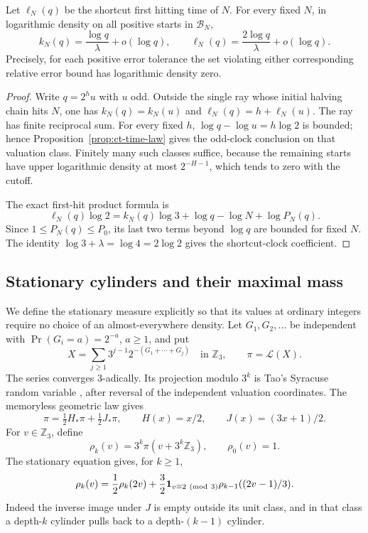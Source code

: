 \begin{proposition}
\label{prop:ct-clock-conversion}
Let \(\ell_N(q)\) be the shortcut first hitting time of \(N\).
For every fixed \(N\), in logarithmic density on all positive starts
in \(\mathcal B_N\),
\[
 k_N(q)=\frac{\log q}{\lambda}+o(\log q),\qquad
 \ell_N(q)=\frac{2\log q}{\lambda}+o(\log q).
\]
Precisely, for each positive error tolerance the set violating either
corresponding relative error bound has logarithmic density zero.
\end{proposition}
\begin{proof}
Write \(q=2^hu\) with \(u\) odd. Outside the single ray whose
initial halving chain hits \(N\), one has
\(k_N(q)=k_N(u)\) and \(\ell_N(q)=h+\ell_N(u)\).
The ray has finite reciprocal sum. For every fixed \(h\),
\(\log q-\log u=h\log2\) is bounded; hence
Proposition~\ref{prop:ct-time-law} gives the odd-clock conclusion
on that valuation class. Finitely many such classes suffice,
because the remaining starts have upper logarithmic density at most
\(2^{-H-1}\), which tends to zero with the cutoff.

The exact first-hit product formula is
\[
 \ell_N(q)\log2
 =k_N(q)\log3+\log q-\log N+\log P_N(q).
\]
Since \(1\le P_N(q)\le P_0\), its last two terms beyond
\(\log q\) are bounded for fixed \(N\).
The identity \(\log3+\lambda=\log4=2\log2\) gives the
shortcut-clock coefficient.
\end{proof}

\subsection{Stationary cylinders and their maximal mass}

We define the stationary measure explicitly so that its values at
ordinary integers require no choice of an almost-everywhere density.
Let \(G_1,G_2,\ldots\) be independent with
\(\Pr(G_i=a)=2^{-a}\), \(a\ge1\), and put
\begin{equation}\label{eq:ct-pi-series}
 X=\sum_{j\ge1}3^{j-1}2^{-(G_1+\cdots+G_j)}
       \quad\text{in }\mathbb Z_3,\qquad \pi=\mathcal L(X).
\end{equation}
The series converges \(3\)-adically. Its projection modulo \(3^k\)
is Tao's Syracuse random variable
\cite[Section~1.4, equations~(1.22)--(1.24)]{Tao2022},
after reversal of the independent valuation coordinates.
The memoryless geometric law gives
\[
 \pi=\tfrac12 H_*\pi+\tfrac12 J_*\pi,\qquad
 H(x)=x/2,\qquad J(x)=(3x+1)/2.
\]
For \(v\in\mathbb Z_3\), define
\begin{equation}\label{eq:ct-rho}
 \rho_k(v)=3^k\pi(v+3^k\mathbb Z_3),\qquad \rho_0(v)=1.
\end{equation}
The stationary equation gives, for \(k\ge1\),
\begin{equation}\label{eq:ct-cylinder-recursion}
 \rho_k(v)=\frac12\rho_k(2v)
       +\frac32\mathbf1_{v\equiv2\ ({\rm mod}\ 3)}
                           \rho_{k-1}((2v-1)/3).
\end{equation}
Indeed the inverse image under \(J\) is empty outside its unit
class, and in that class a depth-\(k\) cylinder pulls back to a
depth-\((k-1)\) cylinder.

